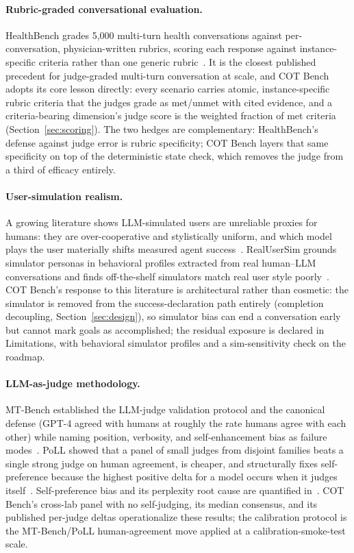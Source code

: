 \paragraph{Rubric-graded conversational evaluation.} HealthBench grades 5{,}000
multi-turn health conversations against per-conversation, physician-written
rubrics, scoring each response against instance-specific criteria rather than one
generic rubric~\cite{healthbench2025}. It is the closest published precedent for
judge-graded multi-turn conversation at scale, and COT Bench adopts its core
lesson directly: every scenario carries atomic, instance-specific rubric
criteria that the judges grade as met/unmet with cited evidence, and a
criteria-bearing dimension's judge score is the weighted fraction of met
criteria (Section~\ref{sec:scoring}). The two hedges are complementary:
HealthBench's defense against judge error is rubric specificity; COT Bench
layers that same specificity on top of the deterministic state check, which
removes the judge from a third of efficacy entirely.

\paragraph{User-simulation realism.} A growing literature shows LLM-simulated
users are unreliable proxies for humans: they are over-cooperative and
stylistically uniform, and which model plays the user materially shifts measured
agent success~\cite{lostinsim2026,sim2real2026}. RealUserSim grounds simulator
personas in behavioral profiles extracted from real human--LLM conversations and
finds off-the-shelf simulators match real user style poorly~\cite{realusersim2026}.
COT Bench's response to this literature is architectural rather than cosmetic: the
simulator is removed from the success-declaration path entirely
(completion decoupling, Section~\ref{sec:design}), so simulator bias can end a
conversation early but cannot mark goals as accomplished; the residual exposure is
declared in Limitations, with behavioral simulator profiles and a sim-sensitivity
check on the roadmap.

\paragraph{LLM-as-judge methodology.} MT-Bench established the LLM-judge validation
protocol and the canonical defense (GPT-4 agreed with humans at roughly the rate
humans agree with each other) while naming position, verbosity, and self-enhancement
bias as failure modes~\cite{mtbench2023}. PoLL showed that a panel of small judges
from disjoint families beats a single strong judge on human agreement, is cheaper,
and structurally fixes self-preference because the highest positive delta for a
model occurs when it judges itself~\cite{poll2024}. Self-preference bias and its
perplexity root cause are quantified in~\cite{selfpref2024}. COT Bench's cross-lab
panel with no self-judging, its median consensus, and its published per-judge deltas
operationalize these results; the calibration protocol is the MT-Bench/PoLL
human-agreement move applied at a calibration-smoke-test scale.

